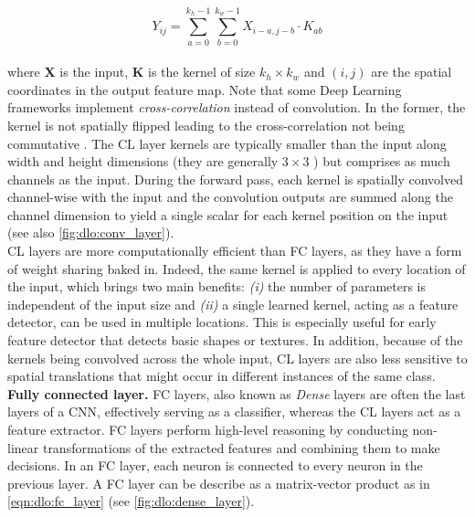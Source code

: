 \begin{equation}
  \label{eqn:dlo:convolution}
    Y_{ij} = \sum_{{a=0}}^{{k_h-1}} \sum_{{b=0}}^{{k_w-1}} X_{i-a, j-b} \cdot K_{ab}    
\end{equation}\\

\noindent where $\mathbf{X}$ is the input, $\mathbf{K}$ is the kernel of size
$k_h \times k_w$ and $(i,j)$ are the spatial coordinates in the output feature
map. Note that some Deep Learning frameworks implement \emph{cross-correlation}
instead of convolution. In the former, the kernel is not spatially flipped
leading to the cross-correlation not being commutative
\cite{goodfellow2016deep}. The \ac{CL} layer kernels are typically smaller than
the input along width and height dimensions (they are generally $3\times 3$
\cite{DBLP:conf/cvpr/HeZRS16}) but comprises as much channels as the input.
During the forward pass, each kernel is spatially convolved channel-wise with
the input and the convolution outputs are summed along the channel dimension to
yield a single scalar for each kernel position on the input (see also
\cref{fig:dlo:conv_layer}).\\

\ac{CL} layers are more computationally efficient than \ac{FC} layers, as they
have a form of weight sharing baked in. Indeed, the same kernel is applied to
every location of the input, which brings two main benefits: \emph{(i)} the
number of parameters is independent of the input size and \emph{(ii)} a single
learned kernel, acting as a feature detector, can be used in multiple locations.
This is especially useful for early feature detector that detects basic shapes
or textures. In addition, because of the kernels being convolved across the
whole input, \ac{CL} layers are also less sensitive to spatial translations that
might occur in different instances of the same class.\\

\noindent \textbf{Fully connected layer.} \ac{FC} layers, also known as
\emph{Dense} layers are often the last layers of a \ac{CNN}, effectively serving
as a classifier, whereas the \ac{CL} layers act as a feature extractor.
\ac{FC} layers perform high-level reasoning by conducting non-linear
transformations of the extracted features and combining them to make decisions.
In an FC layer, each neuron is connected to every neuron in the previous layer.
A \ac{FC} layer can be describe as a matrix-vector product as in
\cref{eqn:dlo:fc_layer} (see \cref{fig:dlo:dense_layer}).\\

